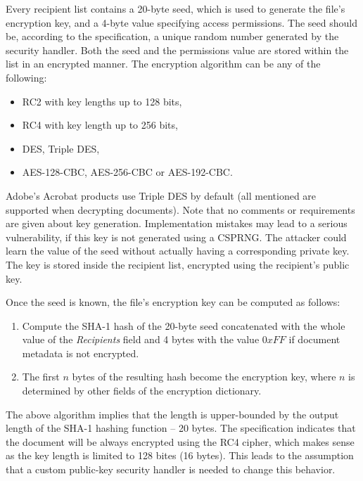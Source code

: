 \documentclass[11pt,oneside]{fithesis2}
\begin{document}
Every recipient list contains a 20-byte seed, which is used to generate the file's encryption key, and a 4-byte value specifying access permissions. The seed should be, according to the specification, a unique random number generated by the security handler. Both the seed and the permissions value are stored within the list in an encrypted manner. The encryption algorithm can be any of the following: 


\begin{itemize}
\setlength\itemsep{0.1em}
	\item{RC2 with key lengths up to 128 bits,}
	\item{RC4 with key length up to 256 bits,}
	\item{DES, Triple DES,}
	\item{AES-128-CBC, AES-256-CBC or AES-192-CBC.}
\end{itemize}

Adobe's Acrobat products use Triple DES by default (all mentioned are supported when decrypting documents). Note that no comments or requirements are given about key generation. Implementation mistakes may lead to a serious vulnerability, if this key is not generated using a CSPRNG. The attacker could learn the value of the seed without actually having a corresponding private key. The key is stored inside the recipient list, encrypted using the recipient's public key. 

Once the seed is known, the file's encryption key can be computed as follows:

\begin{enumerate}
\setlength\itemsep{0.1em}
	\item{Compute the SHA-1 hash of the 20-byte seed concatenated with the whole value of the \textit{Recipients} field and 4 bytes with the value $0xFF$ if document metadata is not encrypted.}
	\item{The first $n$ bytes of the resulting hash become the encryption key, where $n$ is determined by other fields of the encryption dictionary.}
\end{enumerate}

The above algorithm implies that the length is upper-bounded by the output length of the SHA-1 hashing function -- 20 bytes. The specification indicates that the document will be always encrypted using the RC4 cipher, which makes sense as the key length is limited to 128 bites (16 bytes). This leads to the assumption that a custom public-key security handler is needed to change this behavior.   
\end{document}
